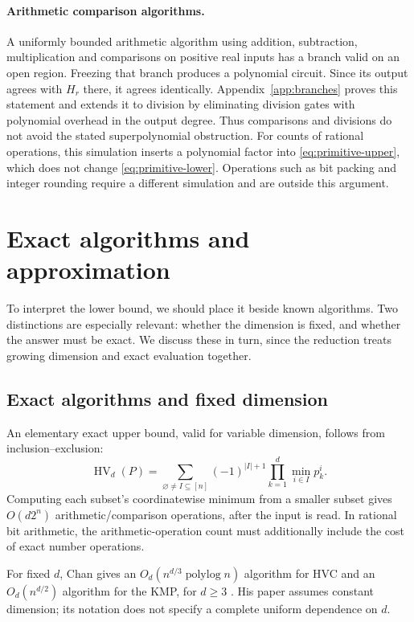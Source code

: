 \documentclass[12pt,a4paper]{article}
\theoremstyle{definition}
\theoremstyle{remark}
\newcommand{\HV}{\operatorname{HV}}
\begin{document}
\paragraph{Arithmetic comparison algorithms.}
A uniformly bounded arithmetic algorithm using addition, subtraction,
multiplication and comparisons on positive real inputs has a branch
valid on an open region. Freezing that branch produces a polynomial
circuit. Since its output agrees with $H_r$ there, it agrees identically.
Appendix~\ref{app:branches} proves this statement and extends it to
division by eliminating division gates with polynomial overhead in the
output degree. Thus comparisons and divisions do not avoid the stated
superpolynomial obstruction. For counts of rational operations, this
simulation inserts a polynomial factor into
\eqref{eq:primitive-upper}, which does not change
\eqref{eq:primitive-lower}. Operations such as bit packing and integer
rounding require a different simulation and are outside this argument.

\section{Exact algorithms and approximation}
\label{sec:limits}

To interpret the lower bound, we should place it beside known
algorithms. Two distinctions are especially relevant: whether the
dimension is fixed, and whether the answer must be exact. We discuss
these in turn, since the reduction treats growing dimension and exact
evaluation together.

\subsection{Exact algorithms and fixed dimension}

An elementary exact upper bound, valid for variable dimension, follows
from inclusion--exclusion:
\begin{equation}
 \HV_d(P)=\sum_{\varnothing\ne I\subseteq[n]}
 (-1)^{|I|+1}\prod_{k=1}^d\min_{i\in I}p^i_k.
 \label{eq:ie}
\end{equation}
Computing each subset's coordinatewise minimum from a smaller subset
gives $O(d2^n)$ arithmetic/comparison operations, after the input is
read. In rational bit
arithmetic, the arithmetic-operation count must additionally include
the cost of exact number operations.

For fixed $d$, Chan gives an $O_d(n^{d/3}\operatorname{polylog}n)$
algorithm for HVC and an $O_d(n^{d/2})$ algorithm for the KMP, for
$d\ge3$ \cite{Chan2013}. His paper assumes constant dimension; its
notation does not specify a complete uniform dependence on $d$.
\end{document}
